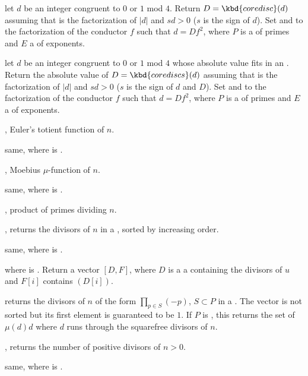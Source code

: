  let $d$ be an
integer congruent to $0$ or $1$ mod $4$. Return
$D = \kbd{coredisc}(d)$ assuming that  is the factorization of $|d|$
and $s d > 0$ ($s$ is the sign of $d$). Set  and  to the
factorization of the conductor $f$ such that $d = Df^2$, where $P$ is a
 of primes and $E$ a  of exponents.

 let $d$ be an
integer congruent to $0$ or $1$ mod $4$ whose absolute value fits in an
. Return the absolute value of $D = \kbd{corediscs}(d)$ assuming
that  is the factorization of $|d|$ and $s d > 0$ ($s$ is the sign of
$d$ and $D$). Set  and  to the factorization of the
conductor $f$ such that $d = Df^2$, where $P$ is a  of primes
and $E$ a  of exponents.

, Euler's totient function of $n$.

 same, where  is .

, Moebius $\mu$-function of $n$.

 same, where  is .

, product of primes dividing $n$.

, returns the divisors of $n$ in a
, sorted by increasing order.

 same, where  is .

 where  is .
Return a vector $[D,F]$, where $D$ is a a  containing the
divisors of $u$ and $F[i]$ contains $(D[i])$.

 returns the divisors of $n$ of the form
$\prod_{p\in S} (-p)$, $S\subset P$ in a . The vector is not
sorted but its first element is guaranteed to be $1$. If $P$ is
, this returns the set of $\mu(d) d$ where $d$ runs
through the squarefree divisors of $n$.

, returns the number of positive divisors of $n>0$.

 same, where  is .

